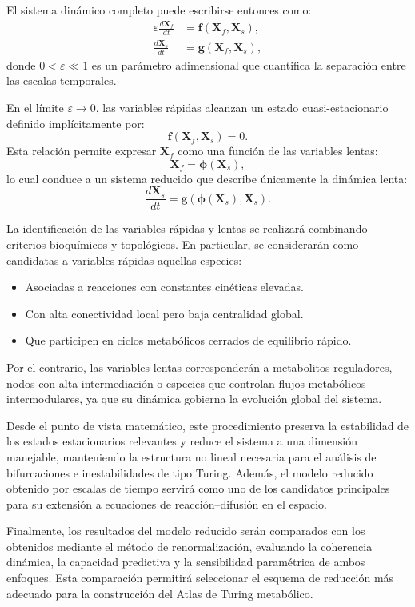\documentclass[12pt,spanish]{article}
\begin{document}
	El sistema dinámico completo puede escribirse entonces como:
	\begin{align*}
		\varepsilon \frac{d\mathbf{X}_f}{dt} &= \mathbf{f}(\mathbf{X}_f, \mathbf{X}_s), \\
		\frac{d\mathbf{X}_s}{dt} &= \mathbf{g}(\mathbf{X}_f, \mathbf{X}_s),
	\end{align*}
	donde $0 < \varepsilon \ll 1$ es un parámetro adimensional que cuantifica la separación entre las escalas temporales.
	
	En el límite $\varepsilon \to 0$, las variables rápidas alcanzan un estado cuasi-estacionario definido implícitamente por:
	\[
	\mathbf{f}(\mathbf{X}_f, \mathbf{X}_s) = 0.
	\]
	Esta relación permite expresar $\mathbf{X}_f$ como una función de las variables lentas:
	\[
	\mathbf{X}_f = \boldsymbol{\phi}(\mathbf{X}_s),
	\]
	lo cual conduce a un sistema reducido que describe únicamente la dinámica lenta:
	\[
	\frac{d\mathbf{X}_s}{dt} = \mathbf{g}(\boldsymbol{\phi}(\mathbf{X}_s), \mathbf{X}_s).
	\]
	
	La identificación de las variables rápidas y lentas se realizará combinando criterios bioquímicos y topológicos. En particular, se considerarán como candidatas a variables rápidas aquellas especies:
	\begin{itemize}
		\item Asociadas a reacciones con constantes cinéticas elevadas.
		\item Con alta conectividad local pero baja centralidad global.
		\item Que participen en ciclos metabólicos cerrados de equilibrio rápido.
	\end{itemize}
	
	Por el contrario, las variables lentas corresponderán a metabolitos reguladores, nodos con alta intermediación o especies que controlan flujos metabólicos intermodulares, ya que su dinámica gobierna la evolución global del sistema.
	
	Desde el punto de vista matemático, este procedimiento preserva la estabilidad de los estados estacionarios relevantes y reduce el sistema a una dimensión manejable, manteniendo la estructura no lineal necesaria para el análisis de bifurcaciones e inestabilidades de tipo Turing. Además, el modelo reducido obtenido por escalas de tiempo servirá como uno de los candidatos principales para su extensión a ecuaciones de reacción--difusión en el espacio.
	
	Finalmente, los resultados del modelo reducido serán comparados con los obtenidos mediante el método de renormalización, evaluando la coherencia dinámica, la capacidad predictiva y la sensibilidad paramétrica de ambos enfoques. Esta comparación permitirá seleccionar el esquema de reducción más adecuado para la construcción del Atlas de Turing metabólico.
	
\end{document}
